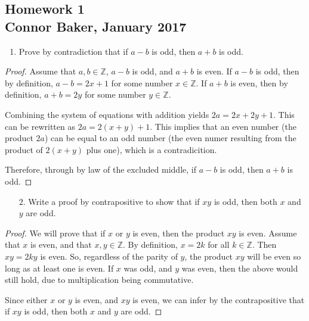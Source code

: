 \documentclass[10pt]{article}
\theoremstyle{definition}
\theoremstyle{plain}
\newcommand{\Z}{\mathbb{Z}}
\begin{document}
\begin{center}
  \subsection*{Homework 1\\Connor Baker, January 2017}
\end{center}

\begin{enumerate}
  \item Prove by contradiction that if $a-b$ is odd, then $a+b$ is odd.
\end{enumerate}

\begin{proof}
  Assume that $a,b\in\Z$, $a-b$ is odd, and $a+b$ is even. If $a-b$ is odd, then by definition, $a-b=2x+1$ for some number $x\in\Z$. If $a+b$ is even, then by definition, $a+b=2y$ for some number $y\in\Z$. \\

  \par Combining the system of equations with addition yields $2a=2x+2y+1$. This can be rewritten as $2a = 2(x+y) + 1$. This implies that an even number (the product $2a$) can be equal to an odd number (the even numer resulting from the product of $2(x+y)$ plus one), which is a contradicition. \\

  \par Therefore, through by law of the excluded middle, if $a-b$ is odd, then $a+b$ is odd.
\end{proof}



\pagebreak



\begin{enumerate}
  \item[2.] Write a proof by contrapositive to show that if $xy$ is odd, then both $x$ and $y$ are odd.
\end{enumerate}

\begin{proof}
  We will prove that if $x$ or $y$ is even, then the product $xy$ is even. Assume that $x$ is even, and that $x,y\in\Z$. By definition, $x=2k$ for all $k\in\Z$. Then $xy=2ky$ is even. So, regardless of the parity of $y$, the product $xy$ will be even so long as at least one is even. If $x$ was odd, and $y$ was even, then the above would still hold, due to multiplication being commutative. \\

  \par Since either $x$ or $y$ is even, and $xy$ is even, we can infer by the contrapositive that if $xy$ is odd, then both $x$ and $y$ are odd.
\end{proof}
\end{document}
